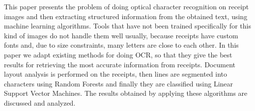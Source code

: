 This paper presents the problem of doing optical character recognition on receipt images and then extracting structured information from the obtained text, using machine learning algorithms. Tools that have not been trained specifically for this kind of images do not handle them well usually, because receipts have custom fonts and, due to size constraints, many letters are close to each other. In this paper we adapt existing methods for doing OCR, so that they give the best results for retrieving the most accurate information from receipts. Document layout analysis is performed on the receipts, then lines are segmented into characters using Random Forests and finally they are classified using Linear Support Vector Machines. The results obtained by applying these algorithms are discussed and analyzed. 